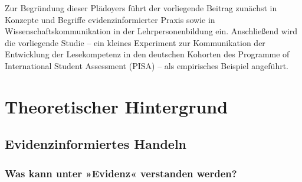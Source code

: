 \documentclass[
  man,
  floatsintext,
  longtable,
  nolmodern,
  notxfonts,
  notimes,
  colorlinks=true,linkcolor=blue,citecolor=blue,urlcolor=blue]{apa7}
\begin{document}
Zur Begründung dieser Plädoyers führt der vorliegende Beitrag zunächst
in Konzepte und Begriffe evidenzinformierter Praxis sowie in
Wissenschaftskommunikation in der Lehrpersonenbildung ein. Anschließend
wird die vorliegende Studie -- ein kleines Experiment zur Kommunikation
der Entwicklung der Lesekompetenz in den deutschen Kohorten des
Programme of International Student Assessment (PISA) -- als empirisches
Beispiel angeführt.

\section{Theoretischer Hintergrund}\label{theoretischer-hintergrund}

\subsection{Evidenzinformiertes
Handeln}\label{evidenzinformiertes-handeln}

\subsubsection{Was kann unter »Evidenz« verstanden
werden?}\label{was-kann-unter-evidenz-verstanden-werden}
\end{document}
